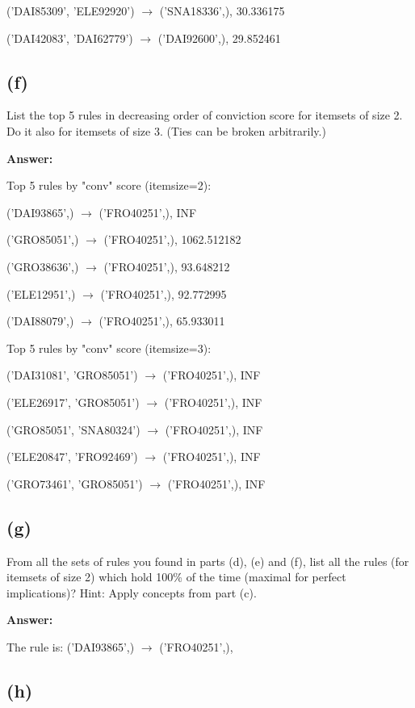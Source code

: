 \documentclass{article}
\begin{document}
('DAI85309', 'ELE92920') $\rightarrow$ ('SNA18336',), 30.336175

('DAI42083', 'DAI62779') $\rightarrow$ ('DAI92600',), 29.852461


\subsection{(f)}

List the top 5 rules in decreasing order of conviction score for itemsets of size 2. Do it also
for itemsets of size 3. (Ties can be broken arbitrarily.)

\textbf{Answer:}

Top 5 rules by "conv" score (itemsize=2):

('DAI93865',) $\rightarrow$ ('FRO40251',), INF

('GRO85051',) $\rightarrow$ ('FRO40251',), 1062.512182

('GRO38636',) $\rightarrow$ ('FRO40251',), 93.648212

('ELE12951',) $\rightarrow$ ('FRO40251',), 92.772995

('DAI88079',) $\rightarrow$ ('FRO40251',), 65.933011


Top 5 rules by "conv" score (itemsize=3):

('DAI31081', 'GRO85051') $\rightarrow$ ('FRO40251',), INF

('ELE26917', 'GRO85051') $\rightarrow$ ('FRO40251',), INF

('GRO85051', 'SNA80324') $\rightarrow$ ('FRO40251',), INF

('ELE20847', 'FRO92469') $\rightarrow$ ('FRO40251',), INF

('GRO73461', 'GRO85051') $\rightarrow$ ('FRO40251',), INF



\subsection{(g)}

From all the sets of rules you found in parts (d), (e) and (f), list all the rules (for itemsets
of size 2) which hold 100\% of the time (maximal for perfect implications)? Hint: Apply
concepts from part (c).

\textbf{Answer:}

The rule is: ('DAI93865',) $\rightarrow$ ('FRO40251',),

\subsection{(h)}
\end{document}

